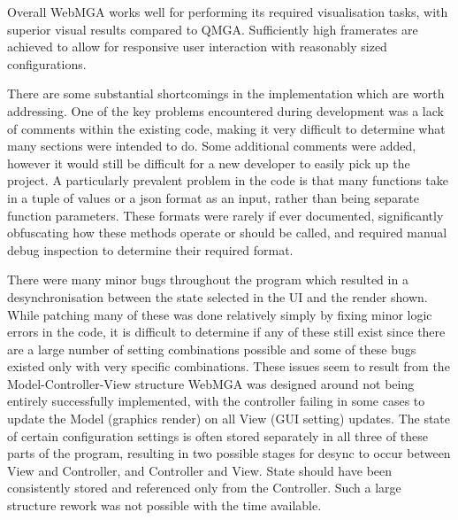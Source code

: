 Overall WebMGA works well for performing its required visualisation tasks, with superior visual results compared to QMGA. Sufficiently high framerates are achieved to allow for responsive user interaction with reasonably sized configurations.

There are some substantial shortcomings in the implementation which are worth addressing. One of the key problems encountered during development was a lack of comments within the existing code, making it very difficult to determine what many sections were intended to do. Some additional comments were added, however it would still be difficult for a new developer to easily pick up the project. A particularly prevalent problem in the code is that many functions take in a tuple of values or a json format as an input, rather than being separate function parameters. These formats were rarely if ever documented, significantly obfuscating how these methods operate or should be called, and required manual debug inspection to determine their required format.

There were many minor bugs throughout the program which resulted in a desynchronisation between the state selected in the UI and the render shown. While patching many of these was done relatively simply by fixing minor logic errors in the code, it is difficult to determine if any of these still exist since there are a large number of setting combinations possible and some of these bugs existed only with very specific combinations. These issues seem to result from the Model-Controller-View structure WebMGA was designed around not being entirely successfully implemented, with the controller failing in some cases to update the Model (graphics render) on all View (GUI setting) updates. The state of certain configuration settings is often stored separately in all three of these parts of the program, resulting in two possible stages for desync to occur between View and Controller, and Controller and View. State should have been consistently stored and referenced only from the Controller. Such a large structure rework was not possible with the time available.
